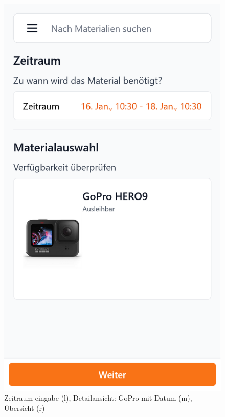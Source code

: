 \begin{figure}[p]
    \includegraphics[scale=0.17]{Bilder/Dialgobeispiel/Falsche Uhrzeit.png}
    \caption[Dialogbeispiel 1]{Zeitraum eingabe (l), Detailansicht: GoPro mit Datum (m), Übersicht (r)}\label{fig:datum}
\end{figure}
